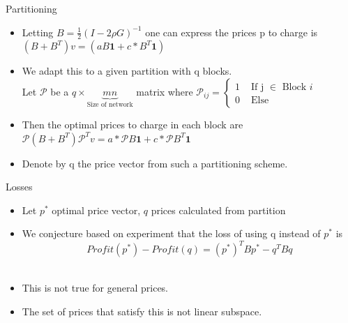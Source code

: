 \documentclass[11pt]{beamer}
\newcommand\<{\langle}
\renewcommand\>{\rangle}
\newcommand\inv{^{-1}}
\renewcommand{\v}[1]{\textbf{#1}}
\begin{document}
\begin{frame}{Partitioning}
  \begin{itemize}
    \item  Letting $B = \frac{1}{2}(I - 2\rho G)\inv$ one can express the prices p to charge is
    $(B + B^{T}) v = (a B \v{1} + c*B^T \v{1}) $ \\
    \item  We adapt this to a given partition with q blocks.\\
    Let $\mathcal{P}$ be a $q \times \underbrace{mn}_{\text{Size of network}}$ matrix where
    $\mathcal{P}_{ij} =
  \begin{cases}
    1 & \text{ If j } \in \text{ Block } i \\
    0 & \text{ Else }
  \end{cases}
  $
  \item  Then the optimal prices to charge in each block are $\mathcal{P} (B+B^{T}) \mathcal{P}^{T} v = a*\mathcal{P}B\v{1} + c*\mathcal{P}B^{T}\v{1}$
  \item Denote by q the price vector from such a partitioning scheme.
\end{itemize}
\end{frame}


\begin{frame}{Losses}
  \begin{itemize}
    \item  Let $p^{*}$ optimal price vector, $q$ prices calculated from partition \\
    \item   We conjecture based on experiment that the loss of using q instead of $p^{*}$ is
  $$ Profit(p^{*}) - Profit(q) = (p^{*})^{T} B p^{*} - q^{T} B q $$\\
  \pause
  \item This is not true for general prices. \\
  \item  The set of prices that satisfy this is not linear subspace.\\
  \end{itemize}
\end{frame}

\end{document}
